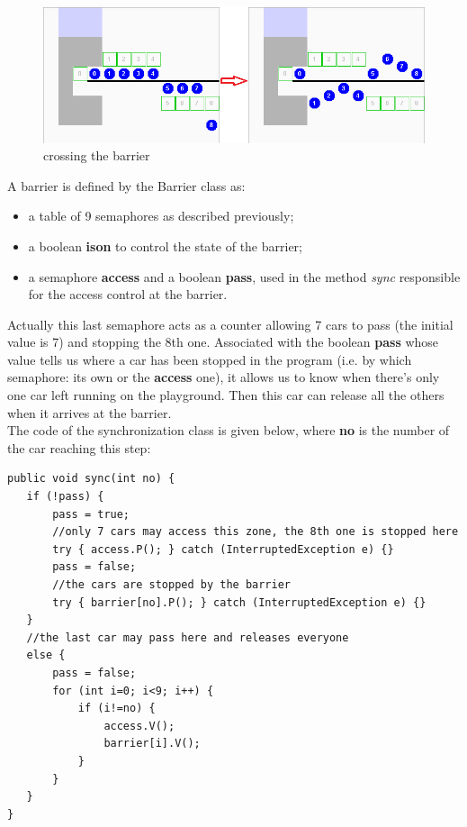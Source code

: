 \documentclass[a4paper,12pt,twoside]{article}
\begin{document}
\begin{figure}[h]
   \caption{\label{Barrier} crossing the barrier}
   \includegraphics[width=14cm]{screens/Barrier}
\end{figure}

A barrier is defined by the Barrier class as:
\begin{itemize}
\item a table of 9 semaphores as described previously;
\item a boolean \textbf{ison} to control the state of the barrier;
\item a semaphore \textbf{access} and a boolean \textbf{pass}, used in the method \textit{sync} responsible for the access control at the barrier.
\end{itemize}
Actually this last semaphore acts as a counter allowing 7 cars to pass (the initial value is 7) and stopping the 8th one. Associated with the boolean \textbf{pass} whose value tells us where a car has been stopped in the program (i.e. by which semaphore: its own or the \textbf{access} one), it allows us to know when there's only one car left running on the playground. Then this car can release all the others when it arrives at the barrier.\\
The code of the synchronization class is given below, where \textbf{no} is the number of the car reaching this step:
\begin{verbatim}
public void sync(int no) {
   if (!pass) {
	   pass = true;
	   //only 7 cars may access this zone, the 8th one is stopped here
	   try { access.P(); } catch (InterruptedException e) {}
	   pass = false;
	   //the cars are stopped by the barrier
	   try { barrier[no].P(); } catch (InterruptedException e) {}
   }
   //the last car may pass here and releases everyone
   else {
	   pass = false;
	   for (int i=0; i<9; i++) {
		   if (i!=no) {
			   access.V();
			   barrier[i].V();
		   }
	   }
   }
}
\end{verbatim}
\end{document}
